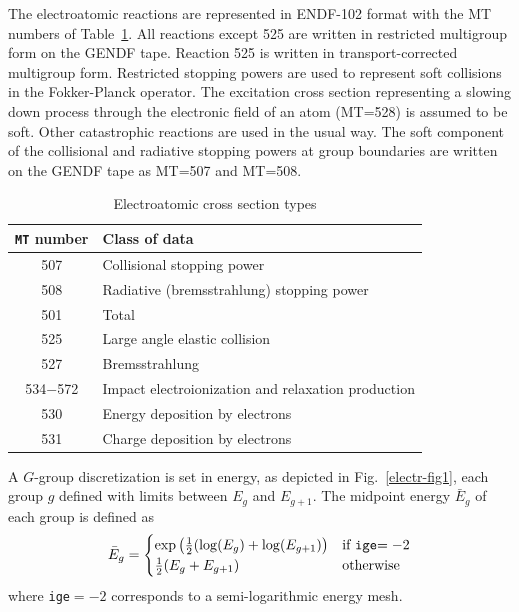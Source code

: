 The electroatomic reactions are represented in ENDF-102 format with the MT
numbers of Table~\ref{tab:electroatomic_xs}. All reactions except 525 are
written in restricted multigroup form on the GENDF tape. Reaction 525 is
written in transport-corrected multigroup form. Restricted stopping powers
are used to represent soft collisions in the Fokker-Planck operator. The
excitation cross section representing a slowing down process through the
electronic field of an atom (MT=528) is assumed to be soft. Other
catastrophic reactions are used in the usual way. The soft component of the
collisional and radiative stopping powers at group boundaries are written on
the GENDF tape as MT=507 and MT=508.

\begin{table}[ht!]
\caption{Electroatomic cross section types}
\label{tab:electroatomic_xs}
\begin{center}
\begin{tabular}{|c|l|}
\hline
{\tt MT} number & Class of data \\
\hline
507 & Collisional stopping power \\
508 & Radiative (bremsstrahlung) stopping power \\
501 & Total \\
525 & Large angle elastic collision \\
527 & Bremsstrahlung \\
534$-$572 & Impact electroionization and relaxation production \\
530 & Energy deposition by electrons \\
531 & Charge deposition by electrons \\
\hline
\end{tabular}
\end{center}
\end{table}

A $G$-group discretization is set in energy, as depicted in
Fig.~\ref{electr-fig1}, each group $g$ defined with limits between $E_g$ and
$E_{g+1}$. The midpoint energy $\bar E_g$ of each group is defined as
  \begin{equation}
    \bar E_g = \begin{cases}
    \exp\left({1\over 2}(\log(E_g) + \log(E_{g+1})\right) &
    \text{if {\tt ige}$=-2$} \\
    {1\over 2}(E_g+E_{g+1}) & \text{otherwise} \end{cases}
  \end{equation}
\noindent where {\tt ige}$=-2$ corresponds to a semi-logarithmic energy mesh.

